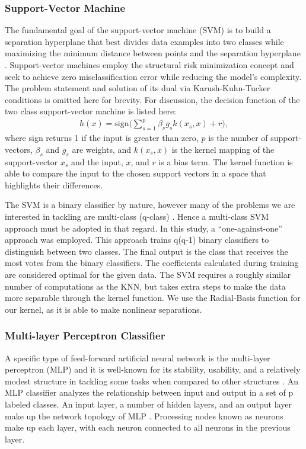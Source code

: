 \subsubsection{Support-Vector Machine}

The fundamental goal of the support-vector machine (SVM) is to build a separation hyperplane that best divides
 data examples into two classes while maximizing the minimum distance between points
 and the separation hyperplane \cite{lazarevic2009support}. 
Support-vector machines employ the structural risk minimization \cite{sewell2008structural}
 concept and seek to achieve zero misclassification error while reducing the 
 model's complexity. 
The problem statement and solution of its dual via Karush-Kuhn-Tucker conditions \cite{gordon2012karush}
is omitted here for brevity. 
For discussion, the decision function of the two class support-vector machine is listed here:
\begin{align}
h(x) = \mathrm{sign} \bigg( \sum_{s=1}^p \beta_s g_s k(x_s, x) + r \bigg),
\end{align}
where sign returns 1 if the input is greater than zero, $p$ is the number of support-vectors, 
$\beta_s$ and $g_s$ are weights, and $k(x_s, x)$ is the kernel mapping of the support-vector $x_s$ and the input, $x$, and $r$ is a bias term.
The kernel function is able to compare the input to the chosen support vectors in a space that highlights their differences.

The SVM is a binary classifier by nature, however many of the problems 
we are interested in tackling are multi-class (q-class) \cite{Oskoei08}.
 Hence a multi-class SVM approach must be adopted in that regard. 
In this study, a “one-against-one” approach \cite{Debnath2004} was employed. 
This approach trains q(q-1) binary classifiers to distinguish between two classes. 
The final output is the class that receives the most votes from 
the binary classifiers. 
The coefficients calculated during training are considered optimal for the given data. 
The SVM requires a roughly similar number of computations as the KNN, but takes extra steps to 
make the data more separable through the kernel function.
We use the Radial-Basis function for our kernel, as it is able to make nonlinear separations.

\subsubsection{Multi-layer Perceptron Classifier}
A specific type of feed-forward artificial neural network is the multi-layer perceptron (MLP)
and it is well-known for its stability, usability, and a relatively modest structure 
in tackling some tasks when compared to other structures \cite{yulita2018multi}. 
An MLP classifier analyzes the relationship between input and output 
in a set of p labeled classes. An input layer, a number of hidden layers, and an output layer 
make up the network topology of MLP \cite{molina2021classification}. 
Processing nodes known as neurons make up each layer, 
with each neuron connected to all neurons in the previous layer. 

